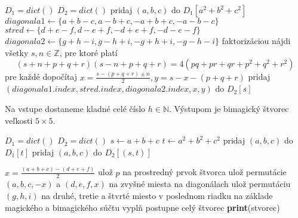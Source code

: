 \begin{algorithmic}
\STATE $D_1 = dict()$
\STATE $D_2 = dict()$
    \STATE pridaj $(a,b,c)$ do $D_1[a^2 + b^2 + c^2]$
\ENDFOR
{}
	  \STATE $diagonala1 \gets \{a+b-c, a-b+c, -a+b+c, -a-b-c\}$
	  \STATE $stred \gets \{d+e-f, d-e+f, -d+e+f, -d-e-f\}$
	  \STATE $diagonala2 \gets \{g+h-i,g-h+i,-g+h+i,-g-h-i\}$
		\STATE faktorizáciou nájdi všetky $s,n \in \mathbb{Z}$, pre ktoré platí
				\begin{equation*}
				(s+n+p+q+r)(s-n+p+q+r) = 4(pq + pr + qr + p^2 + q^2 + r^2)
				\end{equation*}
		\STATE pre každé dopočítaj $x = \frac{s - (p+q+r) \pm n}{2}, y = s - x - (p+q+r)$
			\STATE pridaj $(diagonala1.index,stred.index,diagonala2.index,x,y)$ do $D_2[s]$
		\ENDIF
	  \ENDFOR
    \ENDFOR
\ENDFOR
{}
    \ENDFOR
\ENDFOR
\end{algorithmic}

\begin{subalg} Na vstupe dostaneme kladné celé číslo $h \in \mathbb{N}$. Výstupom je bimagický štvorec veľkosti $5 \times 5$.
\end{subalg}

\begin{algorithmic}
\STATE $D_1 = dict()$
\STATE $D_2 = dict()$
			\STATE $s \gets a+b+c$
			\STATE $t \gets a^2+b^2+c^2$
			\STATE pridaj $(a,b,c)$ do $D_1[t]$
			\STATE pridaj $(a,b,c)$ do $D_2[(s,t)]$
		\ENDFOR
	\ENDFOR
\ENDFOR

		\STATE $x = \frac{(a+b+c) - (d+e+f)}{2}$
						\STATE ulož $p$ na prostredný prvok štvorca
						\STATE ulož permutácie $(a,b,c,-x)$ a $(d,e,f,x)$ na zvyšné miesta na diagonálach
						\STATE ulož permutáciu $(g,h,i)$ na druhé, tretie a štvrté miesto v poslednom riadku
						\STATE na základe magického a bimagického súčtu vyplň postupne celý štvorec
							\STATE \textbf{print}(stvorec)
						\ENDIF
					\ENDFOR
				\ENDIF
			\ENDFOR
		\ENDFOR
	\ENDFOR
\ENDFOR
\end{algorithmic}

